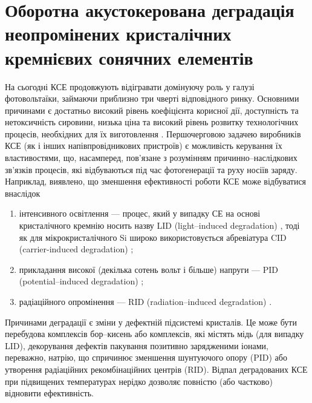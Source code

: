 \section{Оборотна акустокерована деградація неопромінених кристалічних кремнієвих сонячних елементів\label{USID}}

На сьогодні КСЕ продовжують відігравати домінуючу роль у галузі фотовольтаїки, займаючи приблизно три чверті відповідного ринку.
Основними причинами є достатньо високий рівень коефіцієнта корисної дії, доступність та нетоксичність сировини,
низька ціна та високий рівень розвитку технологічних процесів, необхідних для їх виготовлення \cite{Si:Hu}.
Першочерговою задачею виробників КСЕ (як і інших напівпровідникових пристроїв) є можливість керування їх властивостями,
що, насамперед, пов'язане з розумінням причинно--наслідкових зв'язків процесів, які відбуваються під час фотогенерації та руху носіїв заряду.
Наприклад, виявлено, що зменшення ефективності роботи КСЕ може відбуватися внаслідок
\begin{enumerate}[label=\asbuk*),leftmargin=0em,itemindent=1.5em]
  \item інтенсивного освітлення --- процес, який у випадку СЕ на основі кристалічного кремнію носить назву LID (light--induced degradation) \cite{LID:SchmidtJMR,LIDRev,LIDRev2,LID:JAP2017II}, тоді як для мікрокристалічного Si широко використовується абревіатура CID (carrier-induced degradation) \cite{CID:APL,CID:PPS};
  \item прикладання високої (декілька сотень вольт і більше) напруги --- PID  (potential--induced degradation) \cite{PID:SEMSC,PID:PP,PID:2017};
  \item радіаційного опромінення ---  RID (radiation--induced degradation) \cite{Bhat,Karazhanov}.
\end{enumerate}
Причинами деградації є зміни у дефектній підсистемі кристалів.
Це може бути перебудова комплексів бор--кисень або комплексів, які містять мідь (для випадку LID),
декорування дефектів пакування позитивно зарядженими іонами, переважно, натрію, що спричинює зменшення шунтуючого опору (PID)
або утворення радіаційних рекомбінаційних центрів (RID).
Відпал деградованих КСЕ при підвищених температурах нерідко дозволяє повністю (або частково) відновити ефективність.

